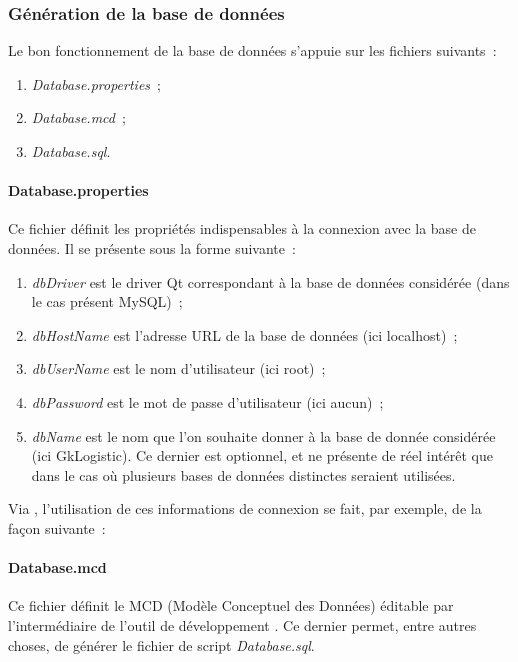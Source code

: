 \subsubsection{Génération de la base de données}
Le bon fonctionnement de la base de données s'appuie sur les fichiers suivants~:
\begin{enumerate}
	\item \emph{Database.properties}~;
	\item \emph{Database.mcd}~;
	\item \emph{Database.sql}.
\end{enumerate}

\paragraph{Database.properties}
Ce fichier définit les propriétés indispensables à la connexion avec la base de données.
Il se présente sous la forme suivante~:

\label{Database.properties}
\begin{enumerate}
	\item \emph{dbDriver} est le driver Qt correspondant à la base de données considérée (dans le cas présent MySQL)~;
	\item \emph{dbHostName} est l'adresse URL de la base de données (ici localhost)~;
	\item \emph{dbUserName} est le nom d'utilisateur (ici root)~;
	\item \emph{dbPassword} est le mot de passe d'utilisateur (ici aucun)~;
	\item \emph{dbName} est le nom que l'on souhaite donner à la base de donnée considérée (ici GkLogistic). Ce dernier est optionnel, et ne présente de réel intérêt que dans le cas où plusieurs bases de données distinctes seraient utilisées.
\end{enumerate}
Via \Qt, l'utilisation de ces informations de connexion se fait, par exemple, de la façon suivante~:

\label{Database.example.cpp}

\paragraph{Database.mcd}
Ce fichier définit le MCD (Modèle Conceptuel des Données) éditable par l'intermédiaire de l'outil de développement \JMerise.
Ce dernier permet, entre autres choses, de générer le fichier de script \emph{Database.sql}.

